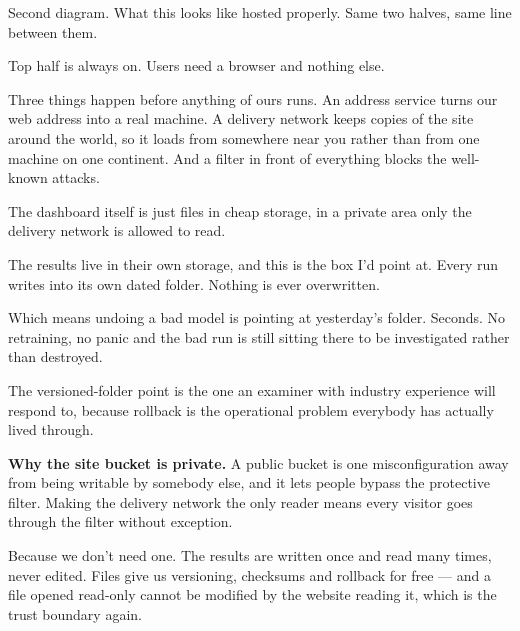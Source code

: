 \documentclass[11pt]{article}
\begin{document}


\begin{saythis}
Second diagram. What this looks like hosted properly. Same two halves, same
line between them.

Top half is always on. Users need a browser and nothing else.

Three things happen before anything of ours runs. An address service turns our
web address into a real machine. A delivery network keeps copies of the site
around the world, so it loads from somewhere near you rather than from one
machine on one continent. And a filter in front of everything blocks the
well-known attacks.

The dashboard itself is just files in cheap storage, in a private area only the
delivery network is allowed to read.

The results live in their own storage, and this is the box I'd point at. Every
run writes into its own dated folder. Nothing is ever overwritten.

Which means undoing a bad model is pointing at yesterday's folder. Seconds. No
retraining, no panic \bt and the bad run is still sitting there to be
investigated rather than destroyed.
\end{saythis}

\begin{means}
The versioned-folder point is the one an examiner with industry experience will
respond to, because rollback is the operational problem everybody has actually
lived through.

\textbf{Why the site bucket is private.} A public bucket is one
misconfiguration away from being writable by somebody else, and it lets people
bypass the protective filter. Making the delivery network the only reader means
every visitor goes through the filter without exception.
\end{means}

\begin{asked}
 Because we don't need one.
The results are written once and read many times, never edited. Files give us
versioning, checksums and rollback for free --- and a file opened read-only
cannot be modified by the website reading it, which is the trust boundary
again.
\end{asked}
\end{document}
